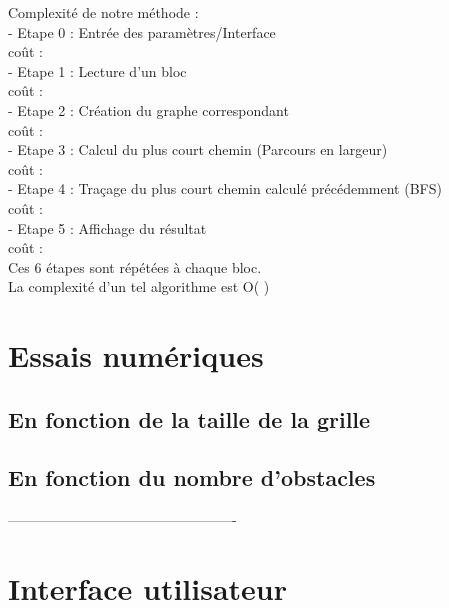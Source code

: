 \documentclass[12pt]{article}
\begin{document}
Complexité de notre méthode :\\
- Etape 0 : Entrée des paramètres/Interface\\
coût : \\
- Etape 1 : Lecture d'un bloc\\
coût : \\
- Etape 2 : Création du graphe correspondant\\
coût :\\
- Etape 3 : Calcul du plus court chemin (Parcours en largeur)\\
coût : \\
- Etape 4 : Traçage du plus court chemin calculé précédemment (BFS)\\
coût : \\
- Etape 5 : Affichage du résultat\\
coût : \\
Ces 6 étapes sont répétées à chaque bloc.\\
La complexité d'un tel algorithme est O( )



\clearpage
\newpage
\section{Essais numériques}

\subsection{En fonction de la taille de la grille}




\subsection{En fonction du nombre d'obstacles}


-------------------------------------------------
\clearpage
\newpage
\section{Interface utilisateur}
\end{document}
